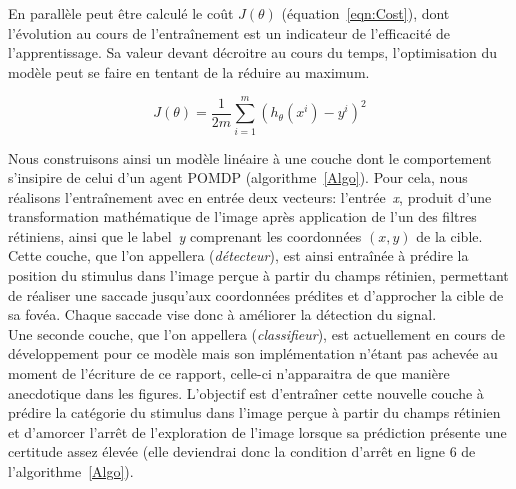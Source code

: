 En parallèle peut être calculé le coût $J(\theta)$ (équation~\ref{eqn:Cost}), dont l'évolution au cours de l'entraînement est un indicateur de l'efficacité de l'apprentissage. Sa valeur devant décroitre au cours du temps, l'optimisation du modèle peut se faire en tentant de la réduire au maximum.

\begin{equation}
J(\theta) = \frac{1}{2m} \sum_{i=1}^m (h_\theta(x^i)-y^i)^2
\label{eqn:Cost}
\end{equation}

Nous construisons ainsi un modèle linéaire à une couche dont le comportement s'insipire de celui d'un agent POMDP (algorithme~\ref{Algo}). Pour cela, nous réalisons l'entraînement avec en entrée deux vecteurs: l'entrée~\textit{x}, produit d'une transformation mathématique de l'image après application de l'un des filtres rétiniens, ainsi que le label~\textit{y} comprenant les coordonnées $(x,y)$ de la cible.\\
Cette couche, que l'on appellera (\textit{détecteur}), est ainsi entraînée à prédire la position du stimulus dans l'image perçue à partir du champs rétinien, permettant de réaliser une saccade jusqu'aux coordonnées prédites et d'approcher la cible de sa fovéa. Chaque saccade vise donc à améliorer la détection du signal.\autocite{Friston2012}\\
Une seconde couche, que l'on appellera (\textit{classifieur}), est actuellement en cours de développement pour ce modèle mais son implémentation n'étant pas achevée au moment de l'écriture de ce rapport, celle-ci n'apparaitra de que manière anecdotique dans les figures. L'objectif est d'entraîner cette nouvelle couche à prédire la catégorie du stimulus dans l'image perçue à partir du champs rétinien et d'amorcer l'arrêt de l'exploration de l'image lorsque sa prédiction présente une certitude assez élevée (elle deviendrai donc la condition d'arrêt en ligne $6$ de l'algorithme~\ref{Algo}).